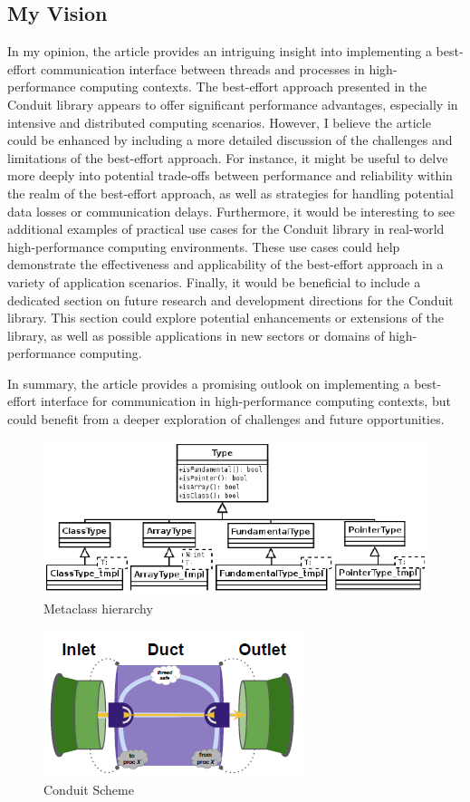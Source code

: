 \documentclass[11pt]{article}
\begin{document}
\begin{multicols*}{2}[\columnsep=1cm]
    \subsection{My Vision}
    In my opinion, the article provides an intriguing insight into implementing a best-effort communication interface between threads and processes in high-performance computing contexts. The best-effort approach presented in the Conduit library appears to offer significant performance advantages, especially in intensive and distributed computing scenarios.
    However, I believe the article could be enhanced by including a more detailed discussion of the challenges and limitations of the best-effort approach. For instance, it might be useful to delve more deeply into potential trade-offs between performance and reliability within the realm of the best-effort approach, as well as strategies for handling potential data losses or communication delays.
    Furthermore, it would be interesting to see additional examples of practical use cases for the Conduit library in real-world high-performance computing environments. These use cases could help demonstrate the effectiveness and applicability of the best-effort approach in a variety of application scenarios.
    Finally, it would be beneficial to include a dedicated section on future research and development directions for the Conduit library. This section could explore potential enhancements or extensions of the library, as well as possible applications in new sectors or domains of high-performance computing.
    
    In summary, the article provides a promising outlook on implementing a best-effort interface for communication in high-performance computing contexts, but could benefit from a deeper exploration of challenges and future opportunities.
    
\end{multicols*}

\begin{figure}
    \centering
    \includegraphics[width=0.5\linewidth]{ClassType.png}
    \caption{Metaclass hierarchy}
    \label{fig:ClassType}
\end{figure}

\begin{figure}
    \centering
    \includegraphics[width=0.5\linewidth]{Conduit.png}
    \caption{Conduit Scheme}
    \label{fig:Conduit}
\end{figure}
\clearpage
\printbibliography
\end{document}
